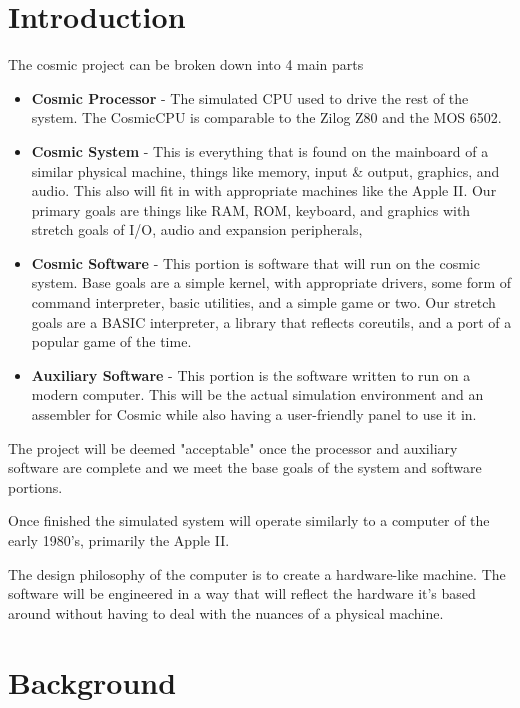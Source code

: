 \documentclass[conference]{IEEEtran}
\begin{document}
\section{Introduction}
The cosmic project can be broken down into 4 main parts
\begin{itemize}
	\item \textbf{Cosmic Processor} - The simulated CPU used to drive the rest of the system. The CosmicCPU is comparable to the Zilog Z80 and the MOS 6502. 
	\item \textbf{Cosmic System} - This is everything that is found on the mainboard of a similar  physical machine, things like memory, input \& output, graphics, and audio. This also will fit in with appropriate machines like the Apple II. Our primary goals are things like RAM, ROM, keyboard, and graphics with stretch goals of I/O, audio and expansion peripherals, 
	\item \textbf{Cosmic Software}  - This portion is software that will run on the cosmic system. Base goals are a simple kernel, with appropriate drivers, some form of command interpreter, basic utilities, and a simple game or two. Our stretch goals are a BASIC interpreter, a library that reflects coreutils, and a port of a popular game of the time. 
	\item \textbf{Auxiliary Software} - This portion is the software written to run on a modern computer. This will be the actual simulation environment and an assembler for Cosmic while also having a user-friendly panel to use it in.
\end{itemize}

The project will be deemed "acceptable" once the processor and auxiliary software are complete and we meet the base goals of the system and software portions.

Once finished the simulated system will operate similarly to a computer of the early 1980's, primarily the Apple II. 

The design philosophy of the computer is to create a hardware-like machine. The software will be engineered in a way that will reflect the hardware it's based around without having to deal with the nuances of a physical machine. 

\section{Background}
\end{document}
